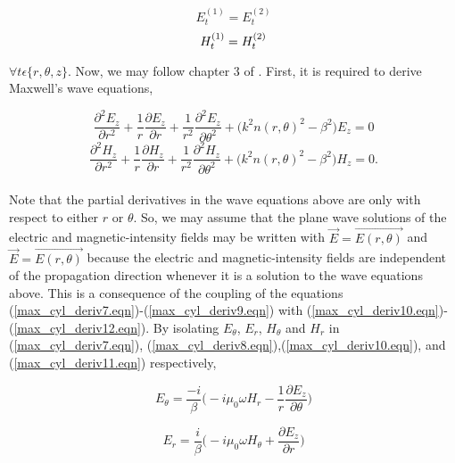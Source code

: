 \documentclass[12pt]{article}
\theoremstyle{definition}
\numberwithin{equation}{section}
\begin{document}
\begin{equation}
E_{t}^{(1)}=E_{t}^{(2)}
\end{equation}
\begin{equation}
H_{t}^{(1)}=H_{t}^{(2)}\\
\end{equation}

$\forall t\epsilon\{r,\theta,z\}$. Now, we may follow chapter 3 of \cite{Okamoto}. First, it is required to derive Maxwell's wave equations,

\begin{equation} 
\frac{\partial^{2}E_{z}}{\partial r^2}+\frac{1}{r}\frac{\partial E_z}{\partial r}+\frac{1}{r^{2}}\frac{\partial^{2}E_z}{\partial\theta^2}+\big( k^{2}n(r,\theta)^{2}-\beta^{2}\big) E_z =0
\label{TMwave.eqn}
\end{equation}
\begin{equation} 
\frac{\partial^{2}H_{z}}{\partial r^2}+\frac{1}{r}\frac{\partial H_z}{\partial r}+\frac{1}{r^{2}}\frac{\partial^{2}H_z}{\partial\theta^2}+\big( k^{2}n(r,\theta)^{2}-\beta^{2}\big) H_z =0.
\label{TEwave.eqn}
\end{equation}\\

Note that the partial derivatives in the wave equations above are only with respect to either $r$ or $\theta$. So, we may assume that the plane wave solutions of the electric and magnetic-intensity fields may be written with $\vec{E}=\overrightarrow{E(r,\theta)}$ and $\vec{E}=\overrightarrow{E(r,\theta)}$ because the electric and magnetic-intensity fields are independent of the propagation direction whenever it is a solution to the wave equations above. This is a consequence of the coupling of the equations (\ref{max_cyl_deriv7.eqn})-(\ref{max_cyl_deriv9.eqn}) with (\ref{max_cyl_deriv10.eqn})-(\ref{max_cyl_deriv12.eqn}). By isolating $E_\theta$, $E_r$, $H_\theta$ and $H_r$ in (\ref{max_cyl_deriv7.eqn}), (\ref{max_cyl_deriv8.eqn}),(\ref{max_cyl_deriv10.eqn}), and (\ref{max_cyl_deriv11.eqn}) respectively,

\begin{equation}
E_{\theta}=\frac{-i}{\beta}\bigg(-i\mu_{0}\omega H_r -\frac{1}{r}\frac{\partial E_z}{\partial\theta}\bigg)
\label{TE1.eqn}
\end{equation}

\begin{equation}
E_{r}=\frac{i}{\beta}\bigg(-i\mu_{0}\omega H_{\theta} + \frac{\partial E_z}{\partial r}\bigg)
\label{TE2.eqn}
\end{equation}
\end{document}
